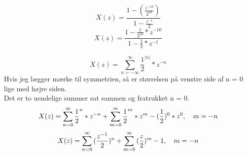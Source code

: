 \begin{Opgaver}
\begin{kapitel}
\begin{Opgave}
\begin{UnderOpgave}[\text{$x[n] = (\frac{1}{2})^n * (u[n] - u[n - 10])$}]
                \[X(z) = \frac{1 - (\frac{z^{-10}}{2^{10}})}{1 - \frac{z^{-1}}{2}}\]
                \[X(z) = \frac{1 - \frac{1}{2^{10}}*z^{-10}}{1 - \frac{1}{2}*z^{-1}}\]
            \end{UnderOpgave}\vspace{20pt}
            \begin{UnderOpgave}[\text{$x[n] = \frac{1}{2}^{|n|}$}]
                \[X(z) = \sum_{n=-\infty}^{\infty}{\frac{1}{2}^{|n|} * z^{-n}}\]
                Hvis jeg lægger mærke til symmetrien, så er størrelsen på venstre side af n = 0 lige med højre siden. \\
                Det er to uendelige summer sat sammen og fratrukket n = 0.\\ 

                \[X(z) = \sum_{n=0}^{\infty}{\frac{1}{2}^n * z^{-n}} + \sum_{m=0}^{\infty}{\frac{1}{2}^m * z^{m}} - (\frac{1}{2})^0 * z^0, \quad m = -n\]
                \[X(z) = \sum_{n=0}^{\infty}{(\frac{z^{-1}}{2})^n} + \sum_{m=0}^{\infty}{(\frac{z}{2})^m} - 1, \quad m = -n\]
                

\end{UnderOpgave}
\end{Opgave}
\end{kapitel}
\end{Opgaver}
